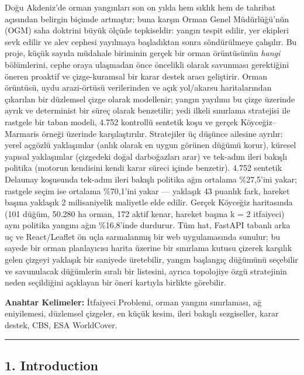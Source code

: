 \documentclass[
  11pt,
]{article}
\begin{document}
Doğu Akdeniz'de orman yangınları son on yılda hem sıklık hem de tahribat
açısından belirgin biçimde artmıştır; buna karşın Orman Genel
Müdürlüğü'nün (OGM) saha doktrini büyük ölçüde tepkiseldir: yangın
tespit edilir, yer ekipleri sevk edilir ve alev cephesi yayılmaya
başladıktan sonra söndürülmeye çalışılır. Bu proje, küçük sayıda
müdahale biriminin gerçek bir orman örüntüsünün \emph{hangi}
bölümlerini, cephe oraya ulaşmadan önce öncelikli olarak savunması
gerektiğini öneren proaktif ve çizge-kuramsal bir karar destek aracı
geliştirir. Orman örüntüsü, uydu arazi-örtüsü verilerinden ve açık
yol/akarsu haritalarından çıkarılan bir düzlemsel çizge olarak
modellenir; yangın yayılımı bu çizge üzerinde ayrık ve determinist bir
süreç olarak benzetilir; yedi ilkeli sınırlama stratejisi ile rastgele
bir taban modeli, 4.752 kontrollü sentetik koşu ve gerçek
Köyceğiz--Marmaris örneği üzerinde karşılaştırılır. Stratejiler üç
düşünce ailesine ayrılır: yerel açgözlü yaklaşımlar (anlık olarak en
uygun görünen düğümü korur), küresel yapısal yaklaşımlar (çizgedeki
doğal darboğazları arar) ve tek-adım ileri bakışlı politika (motorun
kendisini kendi karar süreci içinde benzetir). 4.752 sentetik Delaunay
koşusunda tek-adım ileri bakışlı politika ağın ortalama \%27,5'ini
yakar; rastgele seçim ise ortalama \%70,1'ini yakar --- yaklaşık 43
puanlık fark, hareket başına yaklaşık 2 milisaniyelik maliyetle elde
edilir. Gerçek Köyceğiz haritasında (101 düğüm, 50.280 ha orman, 172
aktif kenar, hareket başına k = 2 itfaiyeci) aynı politika yangını ağın
\%16,8'inde durdurur. Tüm hat, FastAPI tabanlı arka uç ve React/Leaflet
ön uçla sarmalanmış bir web uygulamasında sunulur; bu sayede bir orman
planlayıcısı harita üzerine bir sınırlama kutusu çizerek karşılık gelen
çizgeyi yaklaşık bir saniyede üretebilir, yangın başlangıç düğümünü
seçebilir ve savunulacak düğümlerin sıralı bir listesini, ayrıca
topolojiye özgü stratejinin neden seçildiğini açıklayan bir öneri
kartıyla birlikte görebilir.

\textbf{Anahtar Kelimeler:} İtfaiyeci Problemi, orman yangını
sınırlaması, ağ eniyilemesi, düzlemsel çizgeler, en küçük kesim, ileri
bakışlı sezgiseller, karar destek, CBS, ESA WorldCover.

\begin{center}\rule{0.5\linewidth}{0.5pt}\end{center}

\subsection{1. Introduction}\label{introduction}
\end{document}
